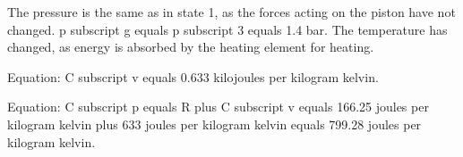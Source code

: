 The pressure is the same as in state 1, as the forces acting on the piston have not changed. p subscript g equals p subscript 3 equals 1.4 bar. The temperature has changed, as energy is absorbed by the heating element for heating.

Equation: C subscript v equals 0.633 kilojoules per kilogram kelvin.

Equation: C subscript p equals R plus C subscript v equals 166.25 joules per kilogram kelvin plus 633 joules per kilogram kelvin equals 799.28 joules per kilogram kelvin.